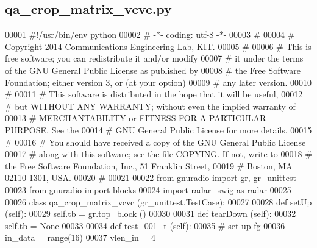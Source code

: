 \subsection{qa\+\_\+crop\+\_\+matrix\+\_\+vcvc.\+py}
\label{qa__crop__matrix__vcvc_8py_source}

\begin{DoxyCode}
00001 \textcolor{comment}{#!/usr/bin/env python}
00002 \textcolor{comment}{# -*- coding: utf-8 -*-}
00003 \textcolor{comment}{# }
00004 \textcolor{comment}{# Copyright 2014 Communications Engineering Lab, KIT.}
00005 \textcolor{comment}{# }
00006 \textcolor{comment}{# This is free software; you can redistribute it and/or modify}
00007 \textcolor{comment}{# it under the terms of the GNU General Public License as published by}
00008 \textcolor{comment}{# the Free Software Foundation; either version 3, or (at your option)}
00009 \textcolor{comment}{# any later version.}
00010 \textcolor{comment}{# }
00011 \textcolor{comment}{# This software is distributed in the hope that it will be useful,}
00012 \textcolor{comment}{# but WITHOUT ANY WARRANTY; without even the implied warranty of}
00013 \textcolor{comment}{# MERCHANTABILITY or FITNESS FOR A PARTICULAR PURPOSE.  See the}
00014 \textcolor{comment}{# GNU General Public License for more details.}
00015 \textcolor{comment}{# }
00016 \textcolor{comment}{# You should have received a copy of the GNU General Public License}
00017 \textcolor{comment}{# along with this software; see the file COPYING.  If not, write to}
00018 \textcolor{comment}{# the Free Software Foundation, Inc., 51 Franklin Street,}
00019 \textcolor{comment}{# Boston, MA 02110-1301, USA.}
00020 \textcolor{comment}{# }
00021 
00022 \textcolor{keyword}{from} gnuradio \textcolor{keyword}{import} gr, gr\_unittest
00023 \textcolor{keyword}{from} gnuradio \textcolor{keyword}{import} blocks
00024 \textcolor{keyword}{import} radar\_swig \textcolor{keyword}{as} radar
00025 
00026 \textcolor{keyword}{class }qa_crop_matrix_vcvc (gr\_unittest.TestCase):
00027 
00028     \textcolor{keyword}{def }setUp (self):
00029         self.tb = gr.top\_block ()
00030 
00031     \textcolor{keyword}{def }tearDown (self):
00032         self.tb = \textcolor{keywordtype}{None}
00033 
00034     \textcolor{keyword}{def }test_001_t (self):
00035         \textcolor{comment}{# set up fg}
00036         in\_data = range(16)
00037         vlen\_in = 4

\end{DoxyCode}
